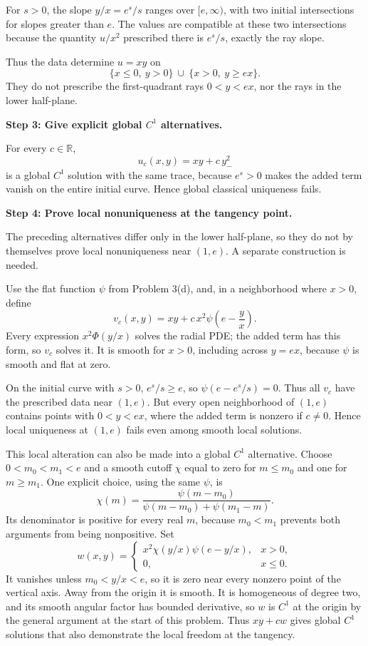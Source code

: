 \documentclass[11pt,a4paper]{article}
\newcommand{\R}{\mathbb R}
\newcommand{\step}[1]{\par\medskip\textbf{#1}\par}
\newcommand{\answer}[1]{\begin{equation*}\boxed{\displaystyle #1}\end{equation*}}
\begin{document}
For $s>0$, the slope $y/x=e^s/s$ ranges over $[e,\infty)$, with two initial intersections for slopes greater than $e$. The values are compatible at these two intersections because the quantity $u/x^2$ prescribed there is $e^s/s$, exactly the ray slope.

Thus the data determine $u=xy$ on
\[
 \{x\le0,\ y>0\}\ \cup\ \{x>0,\ y\ge ex\}.
\]
They do not prescribe the first-quadrant rays $0<y<ex$, nor the rays in the lower half-plane.

\step{Step 3: Give explicit global $C^1$ alternatives.}
For every $c\in\R$,
\answer{u_c(x,y)=xy+c\,y_-^2}
is a global $C^1$ solution with the same trace, because $e^s>0$ makes the added term vanish on the entire initial curve. Hence global classical uniqueness fails.

\step{Step 4: Prove local nonuniqueness at the tangency point.}
The preceding alternatives differ only in the lower half-plane, so they do not by themselves prove local nonuniqueness near $(1,e)$. A separate construction is needed.

Use the flat function $\psi$ from Problem 3(d), and, in a neighborhood where $x>0$, define
\[
 v_c(x,y)=xy+c\,x^2\psi\!\left(e-\frac yx\right).
\]
Every expression $x^2\Phi(y/x)$ solves the radial PDE; the added term has this form, so $v_c$ solves it. It is smooth for $x>0$, including across $y=ex$, because $\psi$ is smooth and flat at zero.

On the initial curve with $s>0$, $e^s/s\ge e$, so $\psi(e-e^s/s)=0$. Thus all $v_c$ have the prescribed data near $(1,e)$. But every open neighborhood of $(1,e)$ contains points with $0<y<ex$, where the added term is nonzero if $c\ne0$. Hence local uniqueness at $(1,e)$ fails even among smooth local solutions.

This local alteration can also be made into a global $C^1$ alternative. Choose $0<m_0<m_1<e$ and a smooth cutoff $\chi$ equal to zero for $m\le m_0$ and one for $m\ge m_1$. One explicit choice, using the same $\psi$, is
\[
 \chi(m)=\frac{\psi(m-m_0)}{\psi(m-m_0)+\psi(m_1-m)}.
\]
Its denominator is positive for every real $m$, because $m_0<m_1$ prevents both arguments from being nonpositive. Set
\[
 w(x,y)=\begin{cases}
 x^2\chi(y/x)\psi(e-y/x),&x>0,\\0,&x\le0.
 \end{cases}
\]
It vanishes unless $m_0<y/x<e$, so it is zero near every nonzero point of the vertical axis. Away from the origin it is smooth. It is homogeneous of degree two, and its smooth angular factor has bounded derivative, so $w$ is $C^1$ at the origin by the general argument at the start of this problem. Thus $xy+cw$ gives global $C^1$ solutions that also demonstrate the local freedom at the tangency.
\end{document}
